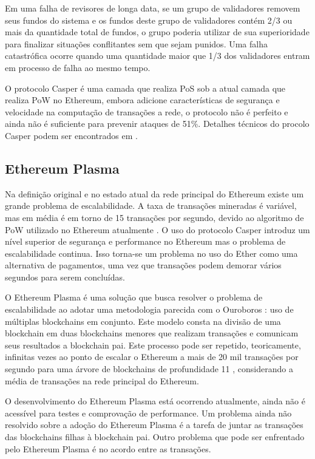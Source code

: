 \documentclass[tcc,capa]{texufpel}
\begin{document}
    Em uma falha de revisores de longa data, se um grupo de validadores removem seus fundos do sistema e os fundos deste grupo de validadores contém 2/3 ou mais da quantidade total de fundos, o grupo poderia utilizar de sua superioridade para finalizar situações conflitantes sem que sejam punidos. Uma falha catastrófica ocorre quando uma quantidade maior que 1/3 dos validadores entram em processo de falha ao mesmo tempo.
    
    O protocolo Casper é uma camada que realiza PoS sob a atual camada que realiza PoW no Ethereum, embora adicione características de segurança e velocidade na computação de transações a rede, o protocolo não é perfeito e ainda não é suficiente para prevenir ataques de 51\%. Detalhes técnicos do procolo Casper podem ser encontrados em \cite{buterin2017}.
    
    
    \subsection{Ethereum Plasma}\label{ssc:ethereum-plasma}
    
    Na definição original e no estado atual da rede principal do Ethereum existe um grande problema de escalabilidade. A taxa de transações mineradas é variável, mas em média é em torno de 15 transações por segundo, devido ao algoritmo de PoW utilizado no Ethereum atualmente \cite{bach2018comparative}. O uso do protocolo Casper introduz um nível superior de segurança e performance no Ethereum mas o problema de escalabilidade continua. Isso torna-se um problema no uso do Ether como uma alternativa de pagamentos, uma vez que transações podem demorar vários segundos para serem concluídas.
    
    O Ethereum Plasma é uma solução que busca resolver o problema de escalabilidade ao adotar uma metodologia parecida com o Ouroboros \cite{kiayias2017ouroboros}: uso de múltiplas blockchains em conjunto. Este modelo consta na divisão de uma blockchain em duas blockchains menores que realizam transações e comunicam seus resultados a blockchain pai. Este processo pode ser repetido, teoricamente, infinitas vezes ao ponto de escalar o Ethereum a mais de 20 mil transações por segundo para uma árvore de blockchains de profundidade 11 \cite{poon2017plasma}, considerando a média de transações na rede principal do Ethereum.
    
    O desenvolvimento do Ethereum Plasma está ocorrendo atualmente, ainda não é acessível para testes e comprovação de performance. Um problema ainda não resolvido sobre a adoção do Ethereum Plasma é a tarefa de juntar as transações das blockchains filhas à blockchain pai. Outro problema que pode ser enfrentado pelo Ethereum Plasma é no acordo entre as transações.
    
\end{document}
